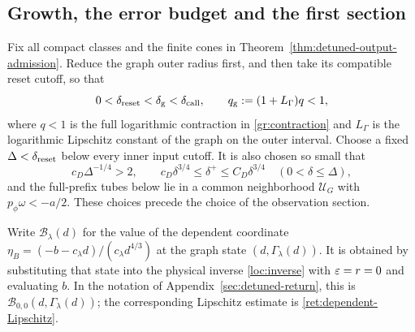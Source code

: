 \subsection{Growth, the error budget and the first section}

Fix all compact classes and the finite cones in
Theorem~\ref{thm:detuned-output-admission}.  Reduce the graph outer radius first, and
then take its compatible reset cutoff, so that
\[
 0<\delta_{\rm reset}<\delta_{\rm g}<\delta_{\rm call},\qquad
 q_{\rm g}:=(1+L_\Gamma)q<1,
\]
where $q<1$ is the full logarithmic contraction in
\eqref{gr:contraction} and $L_\Gamma$ is the logarithmic Lipschitz
constant of the graph on the outer interval.  Choose a fixed
$\Delta<\delta_{\rm reset}$ below every inner input cutoff.  It is
also chosen so small that
\begin{equation}
 c_D\Delta^{-1/4}>2,
 \qquad c_D\delta^{3/4}\le\delta^+\le C_D\delta^{3/4}
 \quad(0<\delta\le\Delta),
 \label{path:growth-bounds}
\end{equation}
and the full-prefix tubes below lie in a common neighborhood
$\mathcal U_G$ with $p_\phi\omega<-a/2$.  These choices precede the
choice of the observation section.

Write $\mathcal B_\lambda(d)$ for the value of the dependent
coordinate $\eta_B=(-b-c_\lambda d)/(c_\lambda d^{4/3})$
at the graph state $(d,\Gamma_\lambda(d))$. It is obtained by
substituting that state into the physical inverse \eqref{loc:inverse}
with $\varepsilon=r=0$ and evaluating $b$. In the notation of
Appendix~\ref{sec:detuned-return}, this is
$\mathcal B_{0,0}(d,\Gamma_\lambda(d))$; the corresponding
Lipschitz estimate is \eqref{ret:dependent-Lipschitz}.

